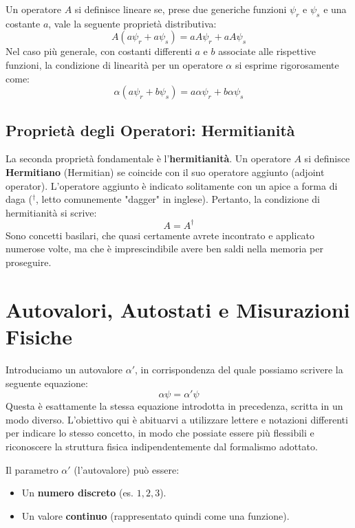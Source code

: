 Un operatore $A$ si definisce lineare se, prese due generiche funzioni $\psi_r$ e $\psi_s$ e una costante $a$, vale la seguente proprietà distributiva:
\begin{equation}
A (a\psi_r + a\psi_s) = a A \psi_r + a A \psi_s
\end{equation}
Nel caso più generale, con costanti differenti $a$ e $b$ associate alle rispettive funzioni, la condizione di linearità per un operatore $\alpha$ si esprime rigorosamente come:
\begin{equation}
\alpha (a\psi_r + b\psi_s) = a \alpha \psi_r + b \alpha \psi_s
\end{equation}

\subsection{Proprietà degli Operatori: Hermitianità}

La seconda proprietà fondamentale è l'\textbf{hermitianità}.
Un operatore $A$ si definisce \textbf{Hermitiano} (Hermitian) se coincide con il suo operatore aggiunto (adjoint operator). L'operatore aggiunto è indicato solitamente con un apice a forma di daga ($^\dagger$, letto comunemente "dagger" in inglese).
Pertanto, la condizione di hermitianità si scrive:
\begin{equation}
A = A^\dagger
\end{equation}
Sono concetti basilari, che quasi certamente avrete incontrato e applicato numerose volte, ma che è imprescindibile avere ben saldi nella memoria per proseguire.

\section{Autovalori, Autostati e Misurazioni Fisiche}

Introduciamo un autovalore $\alpha'$, in corrispondenza del quale possiamo scrivere la seguente equazione:
\begin{equation}
\alpha \psi = \alpha' \psi
\end{equation}
Questa è esattamente la stessa equazione introdotta in precedenza, scritta in un modo diverso. L'obiettivo qui è abituarvi a utilizzare lettere e notazioni differenti per indicare lo stesso concetto, in modo che possiate essere più flessibili e riconoscere la struttura fisica indipendentemente dal formalismo adottato.

Il parametro $\alpha'$ (l'autovalore) può essere:
\begin{itemize}
\item Un \textbf{numero discreto} (es. $1, 2, 3$).
\item Un valore \textbf{continuo} (rappresentato quindi come una funzione).
\end{itemize}

